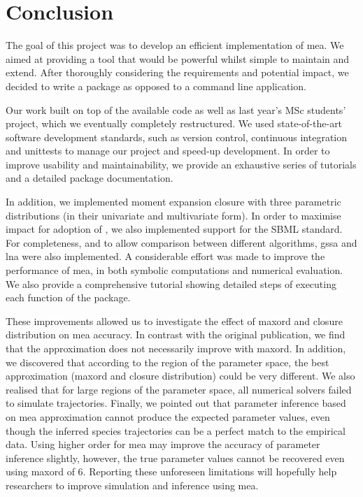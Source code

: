 \section{Conclusion} \label{sec:conclus}

The goal of this project was to develop an efficient \py{} implementation of \acrlong{mea}.
We aimed at providing a tool that would be powerful whilst simple to maintain and extend.
After thoroughly considering the requirements and potential impact, we decided to write a \py{} package as opposed to a command line application.

Our work built on top of the available \mat{} code as well as last year's MSc students' project, which we eventually completely restructured.
We used state-of-the-art software development standards, such as version control, continuous integration and unittests to manage our project and speed-up development.
In order to improve usability and maintainability, we provide an exhaustive series of tutorials and a detailed package documentation.

In addition, we implemented moment expansion closure with three parametric distributions (in their univariate and multivariate form).
In order to maximise impact for adoption of \means, we also implemented support for the SBML standard.
For completeness, and to allow comparison between different algorithms, \gls{gssa} and \gls{lna} were also implemented.
A considerable effort was made to improve the performance of \gls{mea},  in both symbolic computations and numerical evaluation.
We also provide a comprehensive tutorial showing detailed steps of executing each function of the package.

These improvements allowed us to investigate the effect of \gls{maxord} and closure distribution on \gls{mea} accuracy.
In contrast with the original publication, we find that the approximation does not necessarily improve with \gls{maxord}.
In addition, we discovered that according to the region of the parameter space, the best approximation (\gls{maxord} and closure distribution) could be very different.
We also realised that for large regions of the parameter space, all numerical solvers failed to simulate trajectories.
Finally, we pointed out that parameter inference based on \gls{mea} approximation cannot produce the expected parameter values, even though the inferred species trajectories can be a perfect match to the empirical data. Using higher order for \gls{mea} may improve the accuracy of parameter inference slightly, however, the true parameter values cannot be recovered even using \gls{maxord} of 6.
Reporting these unforeseen limitations will hopefully help researchers to improve simulation and inference using \gls{mea}.

